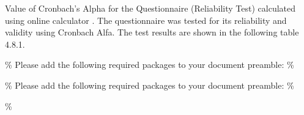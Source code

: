 \documentclass[12pt, bibliography=totoc]{scrartcl}
\begin{document}
Value of Cronbach's Alpha for the Questionnaire (Reliability Test)
calculated using online calculator \textcite{Wassa} . The questionnaire
was tested for its reliability and validity using Cronbach Alfa. The
test results are shown in the following table 4.8.1.

\% Please add the following required packages to your document preamble:
\% \usepackage{booktabs}

\% Please add the following required packages to your document preamble:
\% \usepackage{booktabs} \% \usepackage{graphicx}

\begin{table}[]
\centering
\caption{Zuordnung der Items}
\label{itemtabelle}
\end{table}
\end{document}
